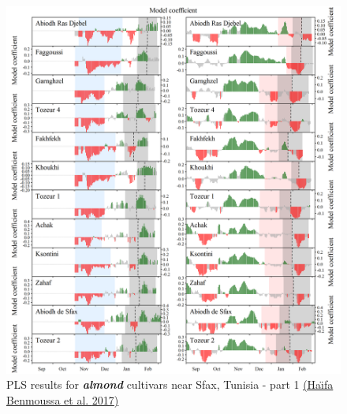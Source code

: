 \documentclass[
]{book}
\begin{document}
\begin{figure}
\centering
\includegraphics{pictures/PLS_chill_force_almonds1_Tunisia.png}
\caption{PLS results for \textbf{\emph{almond}} cultivars near Sfax, Tunisia - part 1 \href{https://www.sciencedirect.com/science/article/abs/pii/S0168192317300734}{(Haı̈fa Benmoussa et al. \protect\hyperlink{ref-benmoussa2017chilling}{2017})}}
\end{figure}
\end{document}
